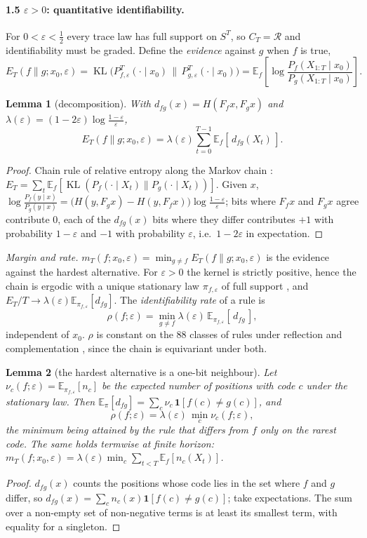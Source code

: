 \documentclass[11pt,a4paper]{article}
\newtheorem{lemma}{Lemma}
\theoremstyle{remark}
\newcommand{\eps}{\varepsilon}
\newcommand{\R}{\mathcal{R}}
\newcommand{\E}{\mathbb{E}}
\DeclareMathOperator{\KL}{KL}
\begin{document}
\paragraph{1.5 $\eps>0$: quantitative identifiability.}
For $0<\eps<\tfrac12$ every trace law has full support on $S^T$, so $C_T=\R$ and identifiability must be graded. Define the \emph{evidence} against $g$ when $f$ is true,
\[
E_T(f\|g;x_0,\eps)=\KL\!\big(P^T_{f,\eps}(\cdot\mid x_0)\,\big\|\,P^T_{g,\eps}(\cdot\mid x_0)\big)=\E_f\!\left[\log\frac{P_f(X_{1:T}\mid x_0)}{P_g(X_{1:T}\mid x_0)}\right].
\]

\begin{lemma}[decomposition]\label{lem:decomp}
With $d_{fg}(x)=H(F_fx,F_gx)$ and $\lambda(\eps)=(1-2\eps)\log\frac{1-\eps}{\eps}$,
\[
E_T(f\|g;x_0,\eps)=\lambda(\eps)\sum_{t=0}^{T-1}\E_f[\,d_{fg}(X_t)\,].
\]
\end{lemma}
\begin{proof}
Chain rule of relative entropy along the Markov chain \citep[Thm.~2.5.3]{CoverThomas}: $E_T=\sum_t\E_f[\KL(P_f(\cdot\mid X_t)\|P_g(\cdot\mid X_t))]$. Given $x$, $\log\frac{P_f(y\mid x)}{P_g(y\mid x)}=\big(H(y,F_gx)-H(y,F_fx)\big)\log\frac{1-\eps}{\eps}$; bits where $F_fx$ and $F_gx$ agree contribute $0$, each of the $d_{fg}(x)$ bits where they differ contributes $+1$ with probability $1-\eps$ and $-1$ with probability $\eps$, i.e.\ $1-2\eps$ in expectation.
\end{proof}

\emph{Margin and rate.} $m_T(f;x_0,\eps)=\min_{g\ne f}E_T(f\|g;x_0,\eps)$ is the evidence against the hardest alternative. For $\eps>0$ the kernel is strictly positive, hence the chain is ergodic with a unique stationary law $\pi_{f,\eps}$ of full support \citep{Norris}, and $E_T/T\to\lambda(\eps)\E_{\pi_{f,\eps}}[d_{fg}]$. The \emph{identifiability rate} of a rule is
\[
\rho(f;\eps)=\min_{g\ne f}\lambda(\eps)\,\E_{\pi_{f,\eps}}[\,d_{fg}\,],
\]
independent of $x_0$. $\rho$ is constant on the $88$ classes of rules under reflection and complementation \citep{LiPackard1990}, since the chain is equivariant under both.

\begin{lemma}[the hardest alternative is a one-bit neighbour]\label{lem:onebit}
Let $\nu_c(f;\eps)=\E_{\pi_{f,\eps}}[n_c]$ be the expected number of positions with code $c$ under the stationary law. Then $\E_\pi[d_{fg}]=\sum_c\nu_c\,\mathbf 1[f(c)\ne g(c)]$, and
\[
\rho(f;\eps)=\lambda(\eps)\,\min_{c}\nu_c(f;\eps),
\]
the minimum being attained by the rule that differs from $f$ only on the rarest code. The same holds termwise at finite horizon: $m_T(f;x_0,\eps)=\lambda(\eps)\min_c\sum_{t<T}\E_f[n_c(X_t)]$.
\end{lemma}
\begin{proof}
$d_{fg}(x)$ counts the positions whose code lies in the set where $f$ and $g$ differ, so $d_{fg}(x)=\sum_c n_c(x)\mathbf 1[f(c)\ne g(c)]$; take expectations. The sum over a non-empty set of non-negative terms is at least its smallest term, with equality for a singleton.
\end{proof}
\end{document}
